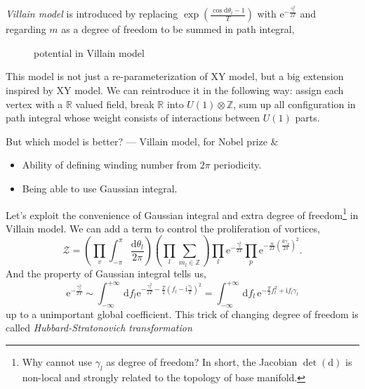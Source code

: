 \emph{Villain model} is introduced by replacing $\exp \left( \frac{\cos \mathrm{d} \theta_{l} - 1}{T} \right)$ with $\mathrm{e}^{- \frac{\gamma_{l}^{2}}{2T}}$ and regarding $m$ as a degree of freedom to be summed in path integral,
\begin{figure}[ht]
    \centering
    \caption{potential in Villain model}
    \label{fig:potential-in-villain-model}
\end{figure}

This model is not just a re-parameterization of XY model, but a big extension inspired by XY model. We can reintroduce it in the following way: assign each vertex with a $\mathbb{R}$ valued field, break $\mathbb{R}$ into $U(1) \otimes \mathbb{Z}$, sum up all configuration in path integral whose weight consists of interactions between $U(1)$ parts.

But which model is better? --- Villain model, for Nobel prize \&
\begin{itemize}
  \item Ability of defining winding number from $2\pi $ periodicity.
  \item Being able to use Gaussian integral.
\end{itemize}

Let's exploit the convenience of Gaussian integral and extra degree of freedom\footnote{
  Why cannot use $\gamma_{l}$ as degree of freedom? In short, the Jacobian $\det \left( \mathrm{d}  \right)$ is non-local and strongly related to the topology of base manifold.
} in Villain model. We can add a term to control the proliferation of vortices,
\begin{equation}
  \mathcal{Z} = \left( \prod_{v} \int _{-\pi }^{\pi } \frac{\mathrm{d} \theta_{l}}{2\pi } \right) \left( \prod_{l} \sum_{m_l \in \mathbb{Z}}  \right) \prod_{l} \mathrm{e}^{- \frac{\gamma_{l}^{2}}{2T}} \prod_{p} \mathrm{e}^{- \frac{u}{2T} \left( \frac{\mathrm{d} \gamma_{p}}{2\pi } \right)^{2}}.
\end{equation}
 And the property of Gaussian integral tells us,
\begin{equation}
  \mathrm{e}^{-\frac{\gamma_{l}^{2}}{2T}} \sim \int_{-\infty}^{+\infty} \, \mathrm{d}f_l \mathrm{e}^{- \frac{\gamma_{l}^{2}}{2T} - \frac{T}{2} \left( f_l - \mathrm{i} \frac{\gamma_{l}}{T} \right)^{2}} = \int_{-\infty}^{+\infty} \, \mathrm{d}f_l \,\mathrm{e}^{- \frac{T}{2} f_l^{2} + \mathrm{i} f_l \gamma_{l}}
\end{equation}
up to a unimportant global coefficient.
This trick of changing degree of freedom is called \emph{Hubbard-Stratonovich transformation}

